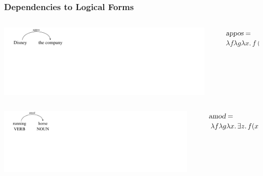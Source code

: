 \documentclass[mathserif,12pt]{beamer}
\renewcommand{\land}{\wedge}
\newcommand{\lspace}{.\,}
\begin{document}
\begin{frame}
\frametitle{Dependencies to Logical Forms}
 \vspace{0.6cm}
\begin{columns}
  \begin{column}{0.40\textwidth}
   \centering
  \vspace{-1em}
\includegraphics[trim=1.5em 9em 28em 0em,clip=true,scale=1.3]{figures/appos}   
  \end{column}
    \begin{column}{0.1\textwidth}
  \end{column}
  \begin{column}{0.58\textwidth}
    \large $\textsl{appos}  =$ \\ \hspace{0.5em} $ \lambda f \lambda g \lambda x \lspace f(x) \land g(x)$ \\
  \end{column}
 \end{columns}
 
 \pause
 \vspace{0.6cm}
 \begin{columns}
  \begin{column}{0.39\textwidth}
   \centering
\includegraphics[trim=1.5em 9em 26em 0em,clip=true,scale=1.2]{figures/amod-verb}
  \end{column}
  \begin{column}{0.1\textwidth}
  \end{column}
  \begin{column}{0.59\textwidth}
\large    $\textsl{amod}= $ \\ \hspace{0.5em} $\lambda f \lambda g \lambda x \lspace \exists z \lspace f(x) \land g(z) \land \hbox{amod}^i(z_e, x_a)$ 
  \end{column}
  

\end{columns}
\end{frame}
\end{document}
